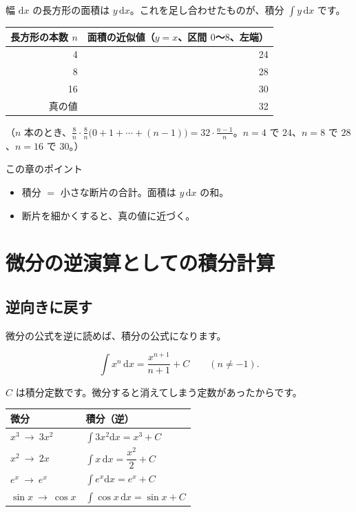 \documentclass[a4paper,11pt,openany]{ltjsbook}
\newcommand{\dd}{\mathrm{d}}
\begin{document}
幅 $\dd x$ の長方形の面積は $y\,\dd x$。これを足し合わせたものが、積分 $\displaystyle\int y\,\dd x$ です。

\begin{center}
\begin{tabular}{rr}
\toprule
長方形の本数 $n$ & 面積の近似値（$y=x$、区間 $0$〜$8$、左端）\\
\midrule
4 & 24\\
8 & 28\\
16 & 30\\
真の値 & 32\\
\bottomrule
\end{tabular}
\end{center}

（$n$ 本のとき、$\frac8n\cdot\frac8n\bigl(0+1+\cdots+(n-1)\bigr)=32\cdot\frac{n-1}{n}$。$n=4$ で $24$、$n=8$ で $28$、$n=16$ で $30$。）

\begin{pointbox}{この章のポイント}
\begin{itemize}[leftmargin=1.5em]
\item 積分 $=$ 小さな断片の合計。面積は $y\,\dd x$ の和。
\item 断片を細かくすると、真の値に近づく。
\end{itemize}
\end{pointbox}

\chapter{微分の逆演算としての積分計算}

\section{逆向きに戻す}

微分の公式を逆に読めば、積分の公式になります。

\[
\int x^n\,\dd x=\frac{x^{n+1}}{n+1}+C\qquad(n\ne-1).
\]

$C$ は積分定数です。微分すると消えてしまう定数があったからです。

\begin{center}
\begin{tabular}{ll}
\toprule
微分 & 積分（逆）\\
\midrule
$x^3\ \to\ 3x^2$ & $\displaystyle\int3x^2\dd x=x^3+C$\\
$x^2\ \to\ 2x$ & $\displaystyle\int x\,\dd x=\dfrac{x^2}{2}+C$\\
$e^x\ \to\ e^x$ & $\displaystyle\int e^x\dd x=e^x+C$\\
$\sin x\ \to\ \cos x$ & $\displaystyle\int\cos x\,\dd x=\sin x+C$\\
\bottomrule
\end{tabular}
\end{center}
\end{document}
